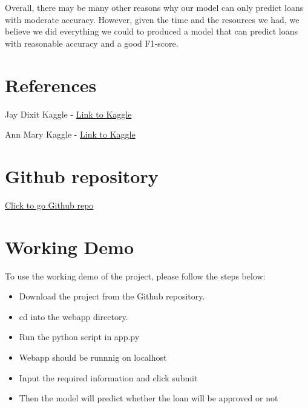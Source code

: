 \documentclass[sigplan]{acmart}
\begin{document}
Overall, there may be many other reasons why our model can only predict loans with moderate accuracy. However, given the time and the resources we had, we believe we did everything we could to produced a model that can predict loans with reasonable accuracy and a good F1-score.

\section{References}

Jay Dixit Kaggle - \href{https://www.kaggle.com/code/annmary25/loan-status-prediction}{Link to Kaggle}

Ann Mary Kaggle - \href{https://www.kaggle.com/code/jayrdixit/loan-default-prediction}{Link to Kaggle}


\section{Github repository}
\href{https://github.com/jackljk/loan-predictions}{Click to go Github repo}


\section{Working Demo}
To use the working demo of the project, please follow the steps below:

\begin{itemize}
    \item Download the project from the Github repository.
    \item cd into the webapp directory.
    \item Run the python script in app.py
    \item Webapp should be runnnig on localhost
    \item Input the required information and click submit
    \item Then the model will predict whether the loan will be approved or not
\end{itemize}
\end{document}
